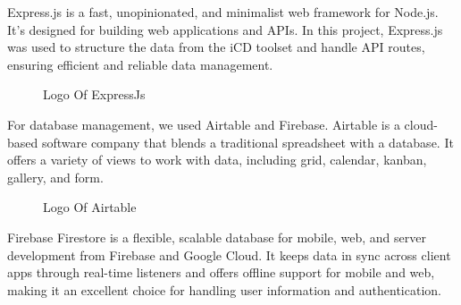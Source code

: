 Express.js is a fast, unopinionated, and minimalist web framework for Node.js. It's designed for building web applications and APIs. In this project, Express.js was used to structure the data from the iCD toolset and handle API routes, ensuring efficient and reliable data management.

\begin{figure}[H]
    \centering
    \caption{  Logo Of ExpressJs }
    \label{fig: ExpressJS_Logo}
\end{figure}

For database management, we used  {\color{purple}Airtable} and  {\color{purple}Firebase}. Airtable is a cloud-based software company that blends a traditional spreadsheet with a database. It offers a variety of views to work with data, including grid, calendar, kanban, gallery, and form. 

\begin{figure}[H]
    \centering
    \caption{  Logo Of Airtable }
    \label{fig: Airtable_Logo}
\end{figure}

\newpage
Firebase Firestore is a flexible, scalable database for mobile, web, and server development from Firebase and Google Cloud. It keeps data in sync across client apps through real-time listeners and offers offline support for mobile and web, making it an excellent choice for handling user information and authentication.


